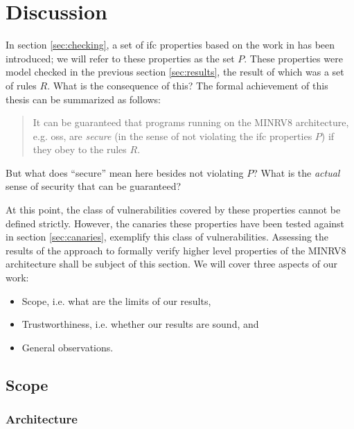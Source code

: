 
\section{Discussion}
\label{sec:discussion}

In section \ref{sec:checking}, a set of \gls{ifc} properties based on the work in \cite{Ferraiuolo17} has been introduced; we will refer to these properties as the set $ P $.
These properties were model checked in the previous section \ref{sec:results}, the result of which was a set of rules $ R $.
What is the consequence of this?
The formal achievement of this thesis can be summarized as follows:
\begin{quote}
    It can be guaranteed that programs running on the MINRV8 architecture, e.g. \glspl{os}, are \textit{secure} (in the sense of not violating the \gls{ifc} properties $ P $) if they obey to the rules $ R $.
\end{quote}
But what does \enquote{secure} mean here besides not violating $ P $?
What is the \textit{actual} sense of security that can be guaranteed?

At this point, the class of vulnerabilities covered by these properties cannot be defined strictly.
However, the canaries these properties have been tested against in section \ref{sec:canaries}, exemplify this class of vulnerabilities.
Assessing the results of the approach to formally verify higher level properties of the MINRV8 architecture shall be subject of this section.
We will cover three aspects of our work:
\begin{itemize}
    \item Scope, i.e. what are the limits of our results,
    \item Trustworthiness, i.e. whether our results are sound, and
    \item General observations.
\end{itemize}

\subsection{Scope}
\label{sec:scope}


\subsubsection{Architecture}
\label{sec:discuss-arch}

